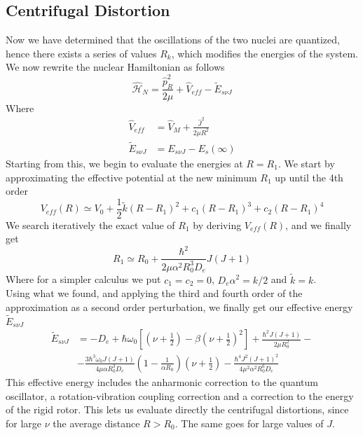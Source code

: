 \documentclass[a4paper, 11pt]{book}
\newcommand{\1}{\opr{\mathds{1}}}
\newcommand{\ham}{\mathcal{H}}
\newcommand{\opr}[1]{\hat{#1}}
\theoremstyle{plain}
\begin{document}
	\subsection{Centrifugal Distortion}
	Now we have determined that the oscillations of the two nuclei are quantized, hence there exists a series of values $R_k$, which modifies the energies of the system. We now rewrite the nuclear Hamiltonian as follows
	\begin{equation}
		\opr{\ham}_N=\frac{\opr{p}_R^2}{2\mu}+\opr{V}_{eff}-\tilde{E}_{s\nu J}
		\label{eq:newnuclearhambo}
	\end{equation}
	Where
	\begin{equation*}
		\begin{aligned}
			\opr{V}_{eff}&=\opr{V}_M+\frac{\opr{J}^2}{2\mu R^2}\\
			\tilde{E}_{s\nu J}&=E_{s\nu J}-E_s(\infty)
		\end{aligned}
	\end{equation*}
	Starting from this, we begin to evaluate the energies at $R=R_1$. We start by approximating the effective potential at the new minimum $R_1$ up until the 4th order
	\begin{equation*}
		V_{eff}(R)\simeq V_0+\frac{1}{2}\tilde{k}(R-R_1)^2+c_1(R-R_1)^3+c_2(R-R_1)^4
	\end{equation*}
	We search iteratively the exact value of $R_1$ by deriving $V_{eff}(R)$, and we finally get
	\begin{equation}
		R_1\simeq R_0+\frac{\hbar^2}{2\mu\alpha^2R_0^3D_e}J(J+1)
		\label{eq:R1bornopp}
	\end{equation}
	Where for a simpler calculus we put $c_1=c_2=0$, $D_e\alpha^2=k/2$ and $\tilde{k}=k$.\\
	Using what we found, and applying the third and fourth order of the approximation as a second order perturbation, we finally get our effective energy $\tilde{E}_{s\nu J}$
	\begin{equation}
		\begin{aligned}
			\tilde{E}_{s\nu J}&=-D_e+\hbar\omega_0\left[ \left( \nu+\frac{1}{2} \right)-\beta\left( \nu+\frac{1}{2} \right)^2 \right]+\frac{\hbar^2J(J+1)}{2\mu R_0^2}-\\
			&-\frac{3\hbar^3\omega_0J(J+1)}{4\mu\alpha R_0^3D_e}\left( 1-\frac{1}{\alpha R_0} \right)\left( \nu+\frac{1}{2} \right)-\frac{\hbar^4J^2(J+1)^2}{4\mu^2\alpha^2R_0^6D_e}
		\end{aligned}
		\label{eq:effectiveenergybornopp}
	\end{equation}
	This effective energy includes the anharmonic correction to the quantum oscillator, a rotation-vibration coupling correction and a correction to the energy of the rigid rotor. This lets us evaluate directly the centrifugal distortions, since for large $\nu$ the average distance $R>R_0$. The same goes for large values of $J$.
\end{document}
